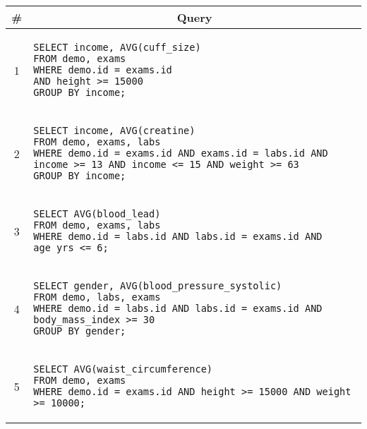 \begin{tabular}{cl}
\toprule
\# & \multicolumn{1}{c}{Query} \\
\midrule
1 & 
\begin{minipage}{6in}
\begin{lstlisting}[breaklines]
SELECT income, AVG(cuff_size)
FROM demo, exams
WHERE demo.id = exams.id
AND height >= 15000
GROUP BY income;
\end{lstlisting}
\end{minipage}{queryno}\label[query]{q1} \\
2 & 
\begin{minipage}{6in}
\begin{lstlisting}[breaklines]
SELECT income, AVG(creatine)
FROM demo, exams, labs
WHERE demo.id = exams.id AND exams.id = labs.id AND income >= 13 AND income <= 15 AND weight >= 63
GROUP BY income;
\end{lstlisting}
\end{minipage}
{queryno}\label[query]{q2} \\
3 & 
\begin{minipage}{6in}
\begin{lstlisting}[breaklines]
SELECT AVG(blood_lead)
FROM demo, exams, labs
WHERE demo.id = labs.id AND labs.id = exams.id AND age_yrs <= 6;
\end{lstlisting}
\end{minipage}{queryno}\label[query]{q3}\\
4 & 
\begin{minipage}{6in}
\begin{lstlisting}[breaklines]
SELECT gender, AVG(blood_pressure_systolic)
FROM demo, labs, exams
WHERE demo.id = labs.id AND labs.id = exams.id AND body_mass_index >= 30
GROUP BY gender;
\end{lstlisting}
\end{minipage}{queryno}\label[query]{q4}\\
5 & 
\begin{minipage}{6in}
\begin{lstlisting}[breaklines]
SELECT AVG(waist_circumference)
FROM demo, exams
WHERE demo.id = exams.id AND height >= 15000 AND weight >= 10000;
\end{lstlisting}
\end{minipage}{queryno}\label[query]{q5}\\
\bottomrule
\end{tabular}

